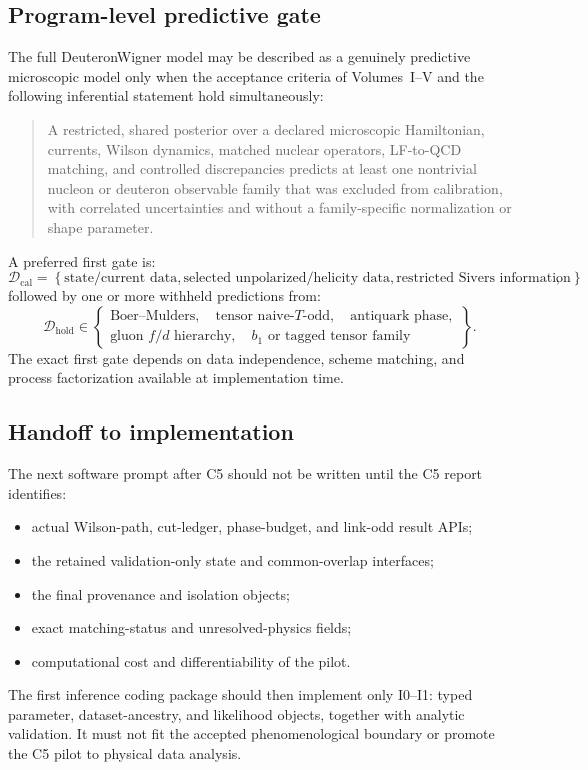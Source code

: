 \documentclass[11pt]{article}
\newcommand{\caldata}{\mathcal D_{\mathrm{cal}}}
\newcommand{\holddata}{\mathcal D_{\mathrm{hold}}}
\begin{document}
\subsection{Program-level predictive gate}

The full DeuteronWigner model may be described as a genuinely predictive
microscopic model only when the acceptance criteria of Volumes~I--V and the
following inferential statement hold simultaneously:
\begin{quote}
A restricted, shared posterior over a declared microscopic Hamiltonian,
currents, Wilson dynamics, matched nuclear operators, LF-to-QCD matching, and
controlled discrepancies predicts at least one nontrivial nucleon or deuteron
observable family that was excluded from calibration, with correlated
uncertainties and without a family-specific normalization or shape parameter.
\end{quote}

A preferred first gate is:
\begin{equation}
 \caldata
 =
 \left\{
 \text{state/current data},
 \text{selected unpolarized/helicity data},
 \text{restricted Sivers information}
 \right\},
 \label{eq:first-calibration-gate}
\end{equation}
followed by one or more withheld predictions from:
\begin{equation}
 \holddata
 \in
 \left\{
 \begin{gathered}
 \text{Boer--Mulders},\quad
 \text{tensor naive-\(T\)-odd},\quad
 \text{antiquark phase},\\
 \text{gluon \(f/d\) hierarchy},\quad
 \text{\(b_1\) or tagged tensor family}
 \end{gathered}
 \right\}.
 \label{eq:first-holdout-gate}
\end{equation}
The exact first gate depends on data independence, scheme matching, and process
factorization available at implementation time.

\subsection{Handoff to implementation}

The next software prompt after C5 should not be written until the C5 report
identifies:
\begin{itemize}
\item actual Wilson-path, cut-ledger, phase-budget, and link-odd result APIs;
\item the retained validation-only state and common-overlap interfaces;
\item the final provenance and isolation objects;
\item exact matching-status and unresolved-physics fields;
\item computational cost and differentiability of the pilot.
\end{itemize}
The first inference coding package should then implement only I0--I1:
typed parameter, dataset-ancestry, and likelihood objects, together with
analytic validation.
It must not fit the accepted phenomenological boundary or promote the C5 pilot
to physical data analysis.
\end{document}
